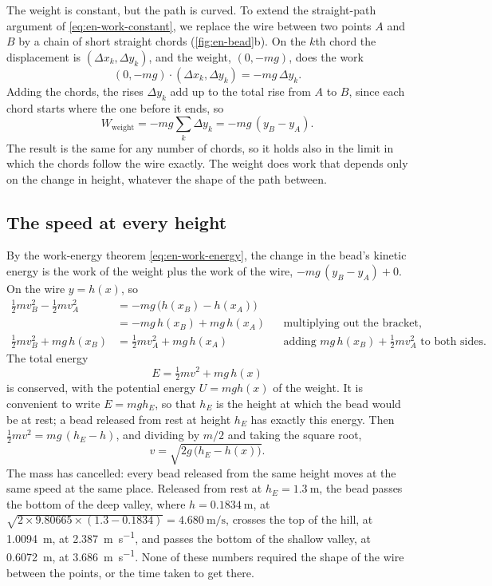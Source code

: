 The weight is constant, but the path is curved. To extend the straight-path
argument of \cref{eq:en-work-constant}, we replace the wire between two
points $A$ and $B$ by a chain of short straight chords
(\cref{fig:en-bead}b). On the $k$th chord the displacement is $(\Delta
x_k, \Delta y_k)$, and the weight, $(0, -mg)$, does the work
\begin{equation*}
   (0, -mg)\cdot(\Delta x_k, \Delta y_k) = -mg\,\Delta y_k .
\end{equation*}
Adding the chords, the rises $\Delta y_k$ add up to the total rise from
$A$ to $B$, since each chord starts where the one before it ends, so
\begin{equation*}
   W_{\mathrm{weight}} = -mg\sum_k\Delta y_k = -mg\,(y_B - y_A) .
\end{equation*}
The result is the same for any number of chords, so it holds also in the
limit in which the chords follow the wire exactly. The weight does work
that depends only on the change in height, whatever the shape of the path
between.

\subsection*{The speed at every height}

By the work-energy theorem \cref{eq:en-work-energy}, the change in the
bead's kinetic energy is the work of the weight plus the work of the
wire, $-mg\,(y_B - y_A) + 0$. On the wire $y = h(x)$, so
\begin{align*}
   \tfrac12 m v_B^2 - \tfrac12 m v_A^2
   &= -mg\,\bigl(h(x_B) - h(x_A)\bigr)\\
   &= -mg\,h(x_B) + mg\,h(x_A)
      && \text{multiplying out the bracket,}\\
   \tfrac12 m v_B^2 + mg\,h(x_B) &= \tfrac12 m v_A^2 + mg\,h(x_A)
      && \text{adding $mg\,h(x_B) + \tfrac12 m v_A^2$ to both sides.}
\end{align*}
The total energy
\begin{equation}
   E = \tfrac12 m v^2 + mg\,h(x)
   \label{eq:en-track-energy}
\end{equation}
is conserved, with the potential energy $U = mgh(x)$ of the weight. It is
convenient to write $E = mgh_E$, so that $h_E$ is the height at which the bead
would be at rest; a bead released from rest at height $h_E$ has exactly
this energy. Then $\frac12 mv^2 = mg\,(h_E - h)$, and dividing by $m/2$ and
taking the square root,
\begin{equation*}
   v = \sqrt{2g\,\bigl(h_E - h(x)\bigr)} .
\end{equation*}
The mass has cancelled: every bead released from the same height moves
at the same speed at the same place. Released from rest at $h_E =
\SI{1.3}{\metre}$, the bead passes the bottom of the deep valley, where
$h = \SI{0.1834}{\metre}$, at $\sqrt{2\times9.80665\times(1.3 - 0.1834)} =
\SI{4.680}{\metre\per\second}$, crosses the top of the hill, at
\SI{1.0094}{\metre}, at \SI{2.387}{\metre\per\second}, and passes the
bottom of the shallow valley, at \SI{0.6072}{\metre}, at
\SI{3.686}{\metre\per\second}. None of these numbers required the shape
of the wire between the points, or the time taken to get there.

